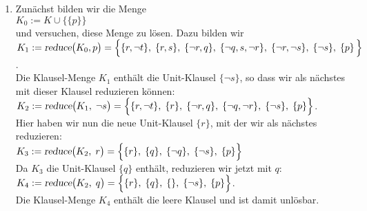 \begin{enumerate}
\item Zun\"{a}chst bilden wir die Menge \\[0.2cm]
      \hspace*{1.3cm} $K_0 := K \cup \bigl\{ \{p\} \bigr\}$       \\[0.2cm]
      und versuchen, diese Menge zu l\"{o}sen.  Dazu bilden wir \\[0.2cm]
      \hspace*{0.3cm} 
      $K_1 := \textsl{reduce}\bigl(K_0,p\bigr) = 
          \Big\{ \{r, \neg t\},\; \{r, s\},\; \{\neg r, q\},\; \{\neg q, s, \neg r\},\; \{\neg r, \neg s\},\; \{ \neg s\},\;\{p\}\, \Big\}$.
      \\[0.2cm]
      Die Klausel-Menge $K_1$ enth\"{a}lt die Unit-Klausel $\{\neg s\}$,
      so dass wir als n\"{a}chstes mit dieser Klausel reduzieren k\"{o}nnen: \\[0.2cm]
      \hspace*{1.3cm} 
      $K_2 := \textsl{reduce}\bigl(K_1,\;\neg s\bigr) = 
              \Big\{ \{r, \neg t\},\; \{r\},\; \{\neg r, q\},\; \{\neg q, \neg r\},\; \{ \neg s\},\; \{p\} \Big\}$.
      \\[0.2cm]
      Hier haben wir nun die neue Unit-Klausel $\{r\}$, mit der wir als n\"{a}chstes reduzieren:
      \\[0.2cm]
      \hspace*{1.3cm} 
      $K_3 := \textsl{reduce}\bigl(K_2,\; r\bigr) = 
              \Big\{ \{r\},\; \{q\},\; \{\neg q\},\; \{ \neg s\},\; \{p\} \Big\}$
      \\[0.2cm]
      Da $K_3$ die Unit-Klausel $\{q\}$ enth\"{a}lt, reduzieren wir jetzt mit $q$: \\[0.2cm]
      \hspace*{1.3cm} 
      $K_4 := \textsl{reduce}\bigl(K_2,\;q\bigr) = 
              \Big\{ \{r\},\; \{q\},\; \{\},\; \{ \neg s\},\; \{p\} \Big\}$.
      \\[0.2cm]
      Die Klausel-Menge $K_4$ enth\"{a}lt die leere Klausel und ist damit unl\"{o}sbar.
     

\end{enumerate}
